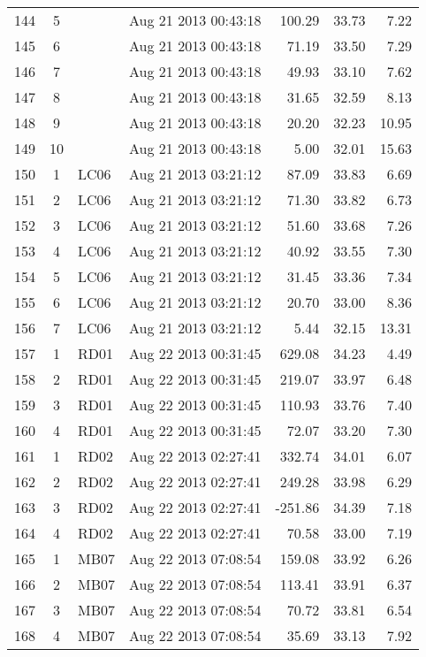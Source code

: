 \documentclass{article}
\begin{document}
\begin{longtable}{ccllrrr}
144 & 5 &  & Aug 21 2013 00:43:18 & 100.29 & 33.73 & 7.22 \\
145 & 6 &  & Aug 21 2013 00:43:18 & 71.19 & 33.50 & 7.29 \\
146 & 7 &  & Aug 21 2013 00:43:18 & 49.93 & 33.10 & 7.62 \\
147 & 8 &  & Aug 21 2013 00:43:18 & 31.65 & 32.59 & 8.13 \\
148 & 9 &  & Aug 21 2013 00:43:18 & 20.20 & 32.23 & 10.95 \\
149 & 10 &  & Aug 21 2013 00:43:18 & 5.00 & 32.01 & 15.63 \\
\hline
150 & 1 & LC06 & Aug 21 2013 03:21:12 & 87.09 & 33.83 & 6.69 \\
151 & 2 & LC06 & Aug 21 2013 03:21:12 & 71.30 & 33.82 & 6.73 \\
152 & 3 & LC06 & Aug 21 2013 03:21:12 & 51.60 & 33.68 & 7.26 \\
153 & 4 & LC06 & Aug 21 2013 03:21:12 & 40.92 & 33.55 & 7.30 \\
154 & 5 & LC06 & Aug 21 2013 03:21:12 & 31.45 & 33.36 & 7.34 \\
155 & 6 & LC06 & Aug 21 2013 03:21:12 & 20.70 & 33.00 & 8.36 \\
156 & 7 & LC06 & Aug 21 2013 03:21:12 & 5.44 & 32.15 & 13.31 \\
\hline
157 & 1 & RD01 & Aug 22 2013 00:31:45 & 629.08 & 34.23 & 4.49 \\
158 & 2 & RD01 & Aug 22 2013 00:31:45 & 219.07 & 33.97 & 6.48 \\
159 & 3 & RD01 & Aug 22 2013 00:31:45 & 110.93 & 33.76 & 7.40 \\
160 & 4 & RD01 & Aug 22 2013 00:31:45 & 72.07 & 33.20 & 7.30 \\
\hline
161 & 1 & RD02 & Aug 22 2013 02:27:41 & 332.74 & 34.01 & 6.07 \\
162 & 2 & RD02 & Aug 22 2013 02:27:41 & 249.28 & 33.98 & 6.29 \\
163 & 3 & RD02 & Aug 22 2013 02:27:41 & -251.86 & 34.39 & 7.18 \\
164 & 4 & RD02 & Aug 22 2013 02:27:41 & 70.58 & 33.00 & 7.19 \\
\hline
165 & 1 & MB07 & Aug 22 2013 07:08:54 & 159.08 & 33.92 & 6.26 \\
166 & 2 & MB07 & Aug 22 2013 07:08:54 & 113.41 & 33.91 & 6.37 \\
167 & 3 & MB07 & Aug 22 2013 07:08:54 & 70.72 & 33.81 & 6.54 \\
168 & 4 & MB07 & Aug 22 2013 07:08:54 & 35.69 & 33.13 & 7.92 \\

\end{longtable}
\end{document}
